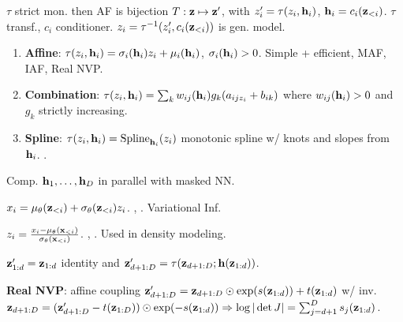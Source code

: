 \begin{definition}[AR Flows]
        \(\tau\) strict mon. then AF is bijection \(T: \vb{z} \mapsto \vb{z}'\), with \(z_i' = \tau(z_i, \vb{h}_i)\), \(\vb{h}_i = c_i(\vb{z}_{<i})\). \(\tau\) transf., \(c_i\) conditioner. \(z_i = \tau^{-1}(z_i', c_i(\vb{z}_{<i}))\) is gen. model.
\end{definition}

\begin{colored}
    \begin{enumerate}
        \item \textbf{Affine}: \(\tau(z_i, \vb{h}_i) = \sigma_i(\vb{h}_i)z_i + \mu_i (\vb{h}_i)\), \(\sigma_i(\vb{h}_i) > 0\). Simple + efficient, MAF, IAF, Real NVP.
        \item \textbf{Combination}: \(\tau(z_i, \vb{h}_i) = \sum_{k} w_{ij}(\vb{h}_i)g_k(a_{ij z_i} + b_{ik})\) where \(w_{ij}(\vb{h}_i) > 0\) and \(g_k\) strictly increasing.
        \item \textbf{Spline}: \(\tau(z_i, \vb{h}_i) = \text{Spline}_{\vb{h}_i}(z_i)\) monotonic spline w/ knots and slopes from \(\vb{h}_i\). .
    \end{enumerate}
\end{colored}

\begin{definition}
    Comp. \(\vb{h}_1, \ldots, \vb{h}_D\) in parallel with masked NN.
\end{definition}

\begin{definition}[IAF]
    \(x_i = \mu_\theta(\vb{z}_{<i}) + \sigma_\theta(\vb{z}_{<i})z_i\). , . Variational Inf.
\end{definition}

\begin{definition}[MAF]
    \(z_i = \frac{x_i - \mu_\theta(\vb{x}_{<i})}{\sigma_\theta(\vb{x}_{<i})}\). , . Used in density modeling.
\end{definition}

\begin{definition}
    \(\vb{z}'_{1:d} = \vb{z}_{1:d}\) identity and \(\vb{z}'_{d+1:D} = \tau(\vb{z}_{d+1:D}; \vb{h}(\vb{z}_{1:d}))\).
    
    \textbf{Real NVP}: affine coupling \(\vb{z}'_{d+1:D} = \vb{z}_{d+1:D} \odot \exp(s(\vb{z}_{1:d})) + t(\vb{z}_{1:d})\) w/ inv. \(\vb{z}_{d+1:D} = (\vb{z}'_{d+1:D}- t(\vb{z}_{1:D})) \odot \exp(- s(\vb{z}_{1:d})) \Rightarrow \log \vert \det J\vert = \sum_{j=d+1}^D s_j(\vb{z}_{1:d})\).
\end{definition}
